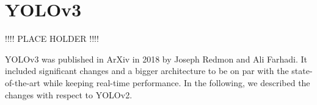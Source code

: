 \documentclass{article}
\begin{document}

\section{YOLOv3}

!!!! PLACE HOLDER !!!!


YOLOv3 \cite{redmon2018yolov3} was published in ArXiv in 2018 by Joseph Redmon and Ali Farhadi. It included significant changes and a bigger architecture to be on par with the state-of-the-art while keeping real-time performance. In the following, we described the changes with respect to YOLOv2.
\end{document}
